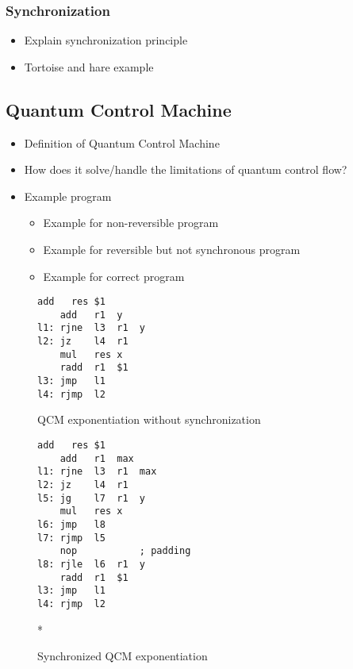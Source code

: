 \subsubsection{Synchronization}
\begin{itemize}
    \item Explain synchronization principle
    \item Tortoise and hare example
\end{itemize}

\subsection{Quantum Control Machine}
\begin{itemize}
    \item Definition of Quantum Control Machine
    \item How does it solve/handle the limitations of quantum control flow?
    \item Example program
    \begin{itemize}
        \item Example for non-reversible program
        \item Example for reversible but not synchronous program
        \item Example for correct program
    \end{itemize}
\end{itemize}


\begin{figure}[htp]
    \centering     
    \begin{minipage}{.40\textwidth}
        \vspace{7.5em}
        \begin{lstlisting}[linewidth=17em,style=QCM]
    add   res $1
    add   r1  y
l1: rjne  l3  r1  y
l2: jz    l4  r1
    mul   res x
    radd  r1  $1
l3: jmp   l1  
l4: rjmp  l2      
        \end{lstlisting}
        \caption{QCM exponentiation without synchronization}
        \label{fig:qcm_not_sync}
    \end{minipage}
    \hfill
    \begin{minipage}{.55\textwidth}
        \begin{lstlisting}[linewidth=23em,style=QCM]
    add   res $1
    add   r1  max
l1: rjne  l3  r1  max
l2: jz    l4  r1
l5: jg    l7  r1  y   
    mul   res x
l6: jmp   l8  
l7: rjmp  l5
    nop           ; padding
l8: rjle  l6  r1  y
    radd  r1  $1
l3: jmp   l1
l4: rjmp  l2
        \end{lstlisting}*
        \caption{Synchronized QCM exponentiation}    
        \label{fig:qcm_sync}
    \end{minipage}
\end{figure}

